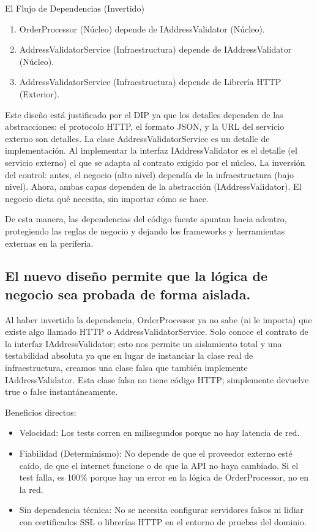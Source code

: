 \documentclass[12pt, a4paper]{article}
\begin{document}
        El Flujo de Dependencias (Invertido)
        \begin{enumerate}
            \item OrderProcessor (Núcleo) depende de IAddressValidator (Núcleo).
            \item AddressValidatorService (Infraestructura) depende de  IAddressValidator (Núcleo).
            \item AddressValidatorService (Infraestructura) depende de Librería HTTP (Exterior).
        \end{enumerate}
        Este diseño está justificado por el DIP ya que los detalles dependen de las abstracciones: el protocolo HTTP, el formato JSON, y la URL del servicio externo son detalles. La clase AddressValidatorService es un detalle de implementación. Al implementar la interfaz IAddressValidator es el detalle (el servicio externo) el que se adapta al contrato exigido por el núcleo. La inversión del control: antes, el negocio (alto nivel) dependía de la infraestructura (bajo nivel). Ahora, ambas capas dependen de la abstracción (IAddressValidator). El negocio dicta qué necesita, sin importar cómo se hace.

        De esta manera, las dependencias del código fuente apuntan hacia adentro, protegiendo las reglas de negocio y dejando los frameworks y herramientas externas en la periferia.

        \subsection{El nuevo diseño permite que la lógica de negocio sea probada de forma aislada.}
        Al haber invertido la dependencia, OrderProcessor ya no sabe (ni le importa) que existe algo llamado HTTP o AddressValidatorService. Solo conoce el contrato de la interfaz IAddressValidator; esto nos permite un aislamiento total y una testabilidad absoluta ya que en lugar de instanciar la clase real de infraestructura, creamos una clase falsa que también implemente IAddressValidator. Esta clase falsa no tiene código HTTP; simplemente devuelve true o false instantáneamente.

        Beneficios directos:
        \begin{itemize}
            \item Velocidad: Los tests corren en milisegundos porque no hay latencia de red.
            \item Fiabilidad (Determinismo): No depende de que el proveedor externo esté caído, de que el internet funcione o de que la API no haya cambiado. Si el test falla, es 100\% porque hay un error en la lógica de OrderProcessor, no en la red.
            \item Sin dependencia técnica: No se necesita configurar servidores falsos ni lidiar con certificados SSL o librerías HTTP en el entorno de pruebas del dominio.
        \end{itemize}
\end{document}
